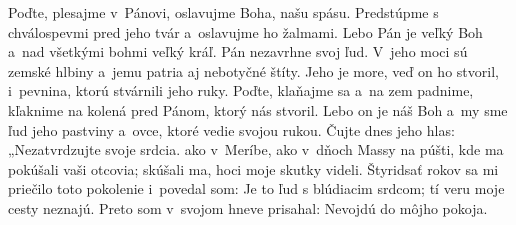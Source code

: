 Poďte, plesajme v~Pánovi,
oslavujme Boha, našu spásu.
Predstúpme s chválospevmi pred jeho tvár
a~oslavujme ho žalmami.
\versseparator
Lebo Pán je veľký Boh
a~nad všetkými bohmi veľký kráľ.
Pán nezavrhne svoj ľud.
V~jeho moci sú zemské hlbiny
a~jemu patria aj nebotyčné štíty.
\versseparator
Jeho je more, veď on ho stvoril,
 i~pevnina, ktorú stvárnili jeho ruky.
Poďte, klaňajme sa a~na zem padnime,
kľaknime na kolená pred Pánom, ktorý nás stvoril.
Lebo on je náš Boh
a~my sme ľud jeho pastviny a~ovce, ktoré vedie svojou rukou.
\versseparator
Čujte dnes jeho hlas:
„Nezatvrdzujte svoje srdcia.
ako v~Meríbe, ako v~dňoch Massy na púšti,
kde ma pokúšali vaši otcovia;
skúšali ma, hoci moje skutky videli.
\versseparator
Štyridsať rokov sa mi priečilo toto pokolenie
 i~povedal som: Je to ľud s blúdiacim srdcom;
tí veru moje cesty neznajú.
Preto som v~svojom hneve prisahal:
Nevojdú do môjho pokoja.
